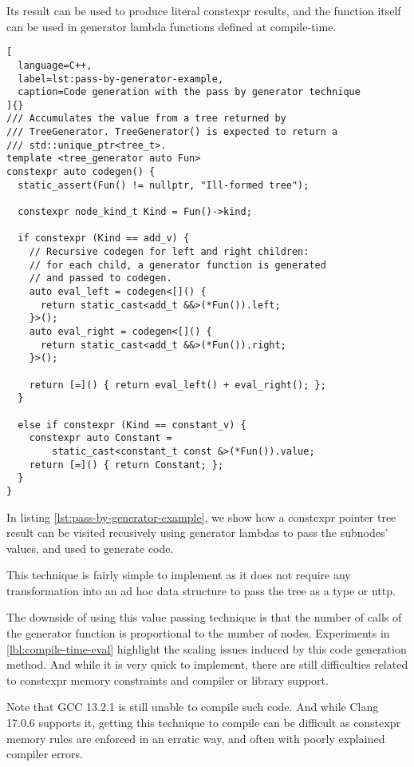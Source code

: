 \documentclass[../main]{subfiles}
\begin{document}
Its result can be used to produce literal \gls{constexpr} results,
and the function itself can be used in generator lambda functions
defined at compile-time.

\begin{lstlisting}[
  language=C++,
  label=lst:pass-by-generator-example,
  caption=Code generation with the pass by generator technique
]{}
/// Accumulates the value from a tree returned by
/// TreeGenerator. TreeGenerator() is expected to return a
/// std::unique_ptr<tree_t>.
template <tree_generator auto Fun>
constexpr auto codegen() {
  static_assert(Fun() != nullptr, "Ill-formed tree");

  constexpr node_kind_t Kind = Fun()->kind;

  if constexpr (Kind == add_v) {
    // Recursive codegen for left and right children:
    // for each child, a generator function is generated
    // and passed to codegen.
    auto eval_left = codegen<[]() {
      return static_cast<add_t &&>(*Fun()).left;
    }>();
    auto eval_right = codegen<[]() {
      return static_cast<add_t &&>(*Fun()).right;
    }>();

    return [=]() { return eval_left() + eval_right(); };
  }

  else if constexpr (Kind == constant_v) {
    constexpr auto Constant =
        static_cast<constant_t const &>(*Fun()).value;
    return [=]() { return Constant; };
  }
}
\end{lstlisting}

In listing \ref{lst:pass-by-generator-example}, we show how a \gls{constexpr}
pointer tree result can be visited recusively using generator lambdas
to pass the subnodes' values, and used to generate code.

This technique is fairly simple to implement as it does not require any
transformation into an ad hoc data structure to pass the tree as a type
or \gls{nttp}.

The downside of using this value passing technique is that the
number of calls of the generator function is proportional to the
number of nodes. Experiments in \ref{lbl:compile-time-eval} highlight
the scaling issues induced by this code generation method.
And while it is very quick to implement, there are still difficulties
related to \gls{constexpr} memory constraints and compiler or library support.

Note that GCC 13.2.1 is still unable to compile such code.
And while Clang 17.0.6 supports it, getting this technique to compile can be
difficult as \gls{constexpr} memory rules are enforced in an erratic way,
and often with poorly explained compiler errors.
\end{document}
